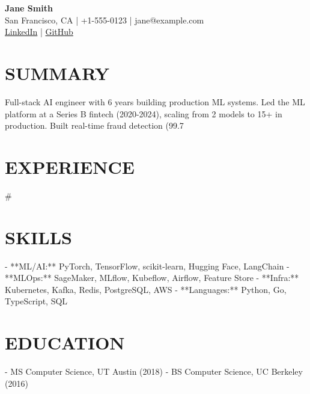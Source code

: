 \documentclass[11pt,a4paper]{article}
\begin{document}
\begin{center}
    {\huge \textbf{Jane Smith}} \\
    San Francisco, CA | +1-555-0123 | jane@example.com \\
    \href{linkedin.com/in/janesmith}{LinkedIn} | \href{github.com/janesmith}{GitHub}
\end{center}

\section{SUMMARY}
Full-stack AI engineer with 6 years building production ML systems. Led the ML platform at a Series B fintech (2020-2024), scaling from 2 models to 15+ in production. Built real-time fraud detection (99.7%

\section{EXPERIENCE}
#

\section{SKILLS}
- **ML/AI:** PyTorch, TensorFlow, scikit-learn, Hugging Face, LangChain
- **MLOps:** SageMaker, MLflow, Kubeflow, Airflow, Feature Store
- **Infra:** Kubernetes, Kafka, Redis, PostgreSQL, AWS
- **Languages:** Python, Go, TypeScript, SQL

\section{EDUCATION}
- MS Computer Science, UT Austin (2018)
- BS Computer Science, UC Berkeley (2016)
\end{document}
